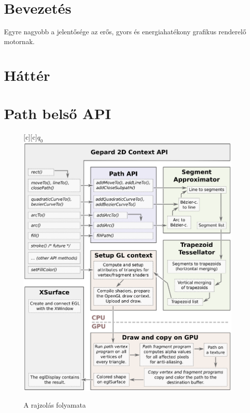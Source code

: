 \documentclass[12pt]{report}
\theoremstyle{definition}
\begin{document}
\chapter*{Bevezetés}

Egyre nagyobb a jelentősége az erős, gyors és energiahatékony grafikus
renderelő motornak.



\chapter{Háttér}



\chapter{Path belső API}

\begin{figure}[h]
\centering
{}[c][c]{$q_0$}
\includegraphics[scale=0.7]{dataflow.eps}
\caption{\label{dataflow-diagram} A rajzolás folyamata}
\end{figure}
\end{document}
